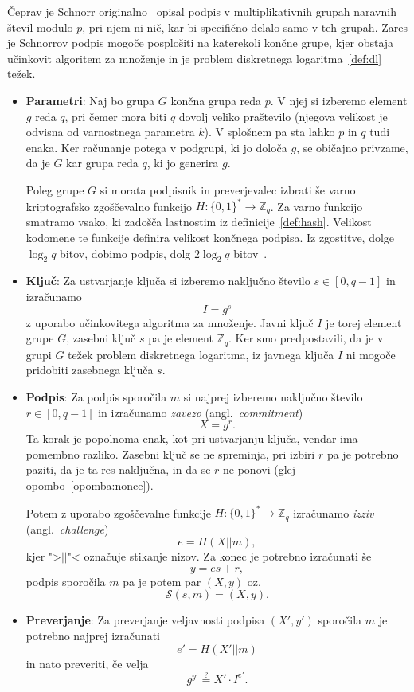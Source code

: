 \documentclass[isrm2, tisk]{fmfdelo}
\newcommand{\Z}{\mathbb Z}
\begin{document}
Čeprav je Schnorr originalno~\cite{schnorr1989sig} opisal podpis v multiplikativnih grupah naravnih
števil modulo $p$, pri njem ni nič, kar bi specifično delalo samo v teh grupah. Zares
je Schnorrov podpis mogoče posplošiti na katerekoli končne grupe, kjer obstaja učinkovit algoritem
za množenje in je problem diskretnega logaritma~\ref{def:dl} težek.
\begin{itemize}
    \item \textbf{Parametri}:
    Naj bo grupa $G$ končna grupa reda $p$. V njej si izberemo element $g$ reda $q$, pri čemer mora
    biti $q$ dovolj veliko praštevilo (njegova velikost je odvisna od varnostnega parametra $k$).
    V splošnem pa sta lahko $p$ in $q$ tudi enaka. Ker računanje potega v podgrupi, ki jo določa $g$,
    se običajno privzame, da je $G$ kar grupa reda $q$, ki jo generira $g$.

    Poleg grupe $G$ si morata podpisnik in preverjevalec izbrati še varno kriptografsko zgoščevalno
    funkcijo $H : \{0, 1\}^* \rightarrow \Z_q$. Za varno funkcijo smatramo vsako, 
    ki zadošča lastnostim iz definicije~\ref{def:hash}. Velikost kodomene te funkcije definira velikost 
    končnega podpisa. Iz zgostitve, dolge $\log_2 q$ bitov, dobimo podpis, dolg $2 \log_2 q$ bitov~\cite{
    stinson2023crypto}.
    \item \textbf{Ključ}:
    Za ustvarjanje ključa si izberemo naključno število $s \in [0, q - 1]$ in izračunamo
    $$
    I = g^s
    $$
    z uporabo učinkovitega algoritma za množenje. Javni ključ $I$ je torej element grupe $G$, zasebni ključ
    $s$ pa je element $\Z_q$. Ker smo predpostavili, da je v grupi $G$ težek problem diskretnega logaritma,
    iz javnega ključa $I$ ni mogoče pridobiti zasebnega ključa $s$.

    \item \textbf{Podpis}:
    Za podpis sporočila $m$ si najprej izberemo naključno število $r \in [0, q - 1]$ in izračunamo
    \textit{zavezo} (angl.\ \textit{commitment})
    $$
    X = g^r.
    $$
    Ta korak je popolnoma enak, kot pri ustvarjanju ključa, vendar ima pomembno razliko. Zasebni
    ključ se ne spreminja, pri izbiri $r$ pa je potrebno paziti, da je ta res naključna, in da se
    $r$ ne ponovi (glej opombo~\ref{opomba:nonce}).

    Potem z uporabo zgoščevalne funkcije $H : \{0, 1\}^* \rightarrow \Z_q$ izračunamo \textit{izziv}
    (angl.\ \textit{challenge})
    $$
    e = H(X || m),
    $$
    kjer ">$||$"< označuje stikanje nizov. Za konec je potrebno izračunati še 
    $$ 
    y = es + r, 
    $$
    podpis sporočila $m$ pa je potem par $(X, y)$ oz.\ 
    $$ 
    \mathcal{S}(s, m) = (X, y).
    $$

    \item \textbf{Preverjanje}:
    Za preverjanje veljavnosti podpisa $(X', y')$ sporočila $m$ je potrebno najprej izračunati
    $$
    e' = H(X' || m)
    $$
    in nato preveriti, če velja
    $$
    g^{y'} \stackrel{?}{=} X' \cdot I^{e'}.
    $$
\end{itemize}
\end{document}

